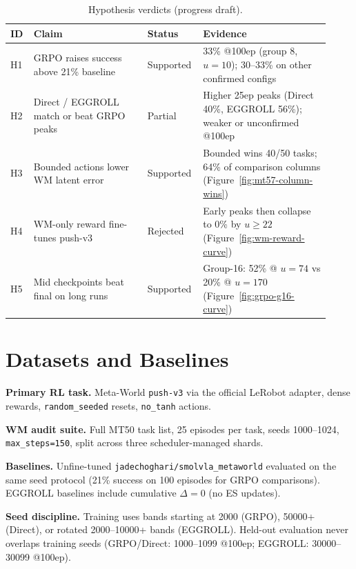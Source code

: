 \begin{table}[H]
\centering
\caption{Hypothesis verdicts (progress draft).}
\label{tab:hypothesis-verdicts}
\small
\begin{tabular}{@{}p{0.06\linewidth}p{0.34\linewidth}p{0.14\linewidth}p{0.38\linewidth}@{}}
\toprule
ID & Claim & Status & Evidence \\
\midrule
H1 & GRPO raises success above 21\% baseline & Supported & 33\% @100ep (group 8, $u{=}10$); 30--33\% on other confirmed configs \\
H2 & Direct / EGGROLL match or beat GRPO peaks & Partial & Higher 25ep peaks (Direct 40\%, EGGROLL 56\%); weaker or unconfirmed @100ep \\
H3 & Bounded actions lower WM latent error & Supported & Bounded wins 40/50 tasks; 64\% of comparison columns (Figure~\ref{fig:mt57-column-wins}) \\
H4 & WM-only reward fine-tunes push-v3 & Rejected & Early peaks then collapse to 0\% by $u{\geq}22$ (Figure~\ref{fig:wm-reward-curve}) \\
H5 & Mid checkpoints beat final on long runs & Supported & Group-16: 52\% @ $u{=}74$ vs 20\% @ $u{=}170$ (Figure~\ref{fig:grpo-g16-curve}) \\
\bottomrule
\end{tabular}
\end{table}

\section{Datasets and Baselines}
\label{sec:datasets-baselines}

\textbf{Primary RL task.} Meta-World \texttt{push-v3} via the official LeRobot adapter, dense rewards, \texttt{random\_seeded} resets, \texttt{no\_tanh} actions.

\textbf{WM audit suite.} Full MT50 task list, 25 episodes per task, seeds 1000--1024, \texttt{max\_steps=150}, split across three scheduler-managed shards.

\textbf{Baselines.} Unfine-tuned \texttt{jadechoghari/smolvla\_metaworld} evaluated on the same seed protocol (21\% success on 100 episodes for GRPO comparisons). EGGROLL baselines include cumulative $\Delta{=}0$ (no ES updates).

\textbf{Seed discipline.} Training uses bands starting at 2000 (GRPO), 50000+ (Direct), or rotated 2000--10000+ bands (EGGROLL). Held-out evaluation never overlaps training seeds (GRPO/Direct: 1000--1099 @100ep; EGGROLL: 30000--30099 @100ep).

